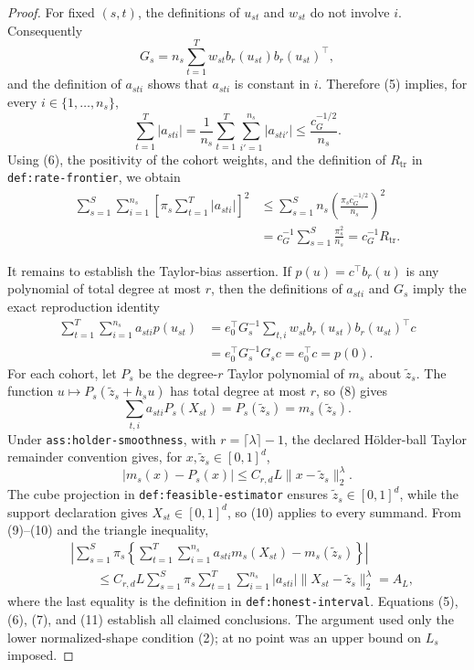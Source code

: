 \documentclass{article}
\begin{document}
\begin{proof}
For fixed \((s,t)\), the definitions of \(u_{st}\) and \(w_{st}\) do not involve \(i\).  Consequently
\[
G_s=n_s\sum_{t=1}^{T}w_{st}b_r(u_{st})b_r(u_{st})^{\top},
\]
and the definition of \(a_{sti}\) shows that \(a_{sti}\) is constant in \(i\).  Therefore (5) implies, for every \(i\in\{1,\ldots,n_s\}\),
\[
\sum_{t=1}^{T}|a_{sti}|
=\frac1{n_s}\sum_{t=1}^{T}\sum_{i'=1}^{n_s}|a_{sti'}|
\le \frac{c_G^{-1/2}}{n_s}.
\tag{6}
\]
Using (6), the positivity of the cohort weights, and the definition of \(R_{\mathrm{tr}}\) in \texttt{def:rate-frontier}, we obtain
\[
\begin{aligned}
\sum_{s=1}^{S}\sum_{i=1}^{n_s}
\left[\pi_s\sum_{t=1}^{T}|a_{sti}|\right]^2
&\le \sum_{s=1}^{S}n_s
\left(\frac{\pi_s c_G^{-1/2}}{n_s}\right)^2\\
&=c_G^{-1}\sum_{s=1}^{S}\frac{\pi_s^2}{n_s}
=c_G^{-1}R_{\mathrm{tr}}.
\end{aligned}
\tag{7}
\]

It remains to establish the Taylor-bias assertion.  If \(p(u)=c^{\top}b_r(u)\) is any polynomial of total degree at most \(r\), then the definitions of \(a_{sti}\) and \(G_s\) imply the exact reproduction identity
\[
\begin{aligned}
\sum_{t=1}^{T}\sum_{i=1}^{n_s}a_{sti}p(u_{st})
&=e_0^{\top}G_s^{-1}
  \sum_{t,i}w_{st}b_r(u_{st})b_r(u_{st})^{\top}c\\
&=e_0^{\top}G_s^{-1}G_sc
=e_0^{\top}c
=p(0).
\end{aligned}
\tag{8}
\]
For each cohort, let \(P_s\) be the degree-\(r\) Taylor polynomial of \(m_s\) about \(\widetilde z_s\).  The function \(u\mapsto P_s(\widetilde z_s+h_su)\) has total degree at most \(r\), so (8) gives
\[
\sum_{t,i}a_{sti}P_s(X_{st})=P_s(\widetilde z_s)=m_s(\widetilde z_s).
\tag{9}
\]
Under \texttt{ass:holder-smoothness}, with \(r=\lceil\lambda\rceil-1\), the declared H\"older-ball Taylor remainder convention gives, for \(x,\widetilde z_s\in[0,1]^d\),
\[
|m_s(x)-P_s(x)|
\le C_{r,d}L\|x-\widetilde z_s\|_2^{\lambda}.
\tag{10}
\]
The cube projection in \texttt{def:feasible-estimator} ensures \(\widetilde z_s\in[0,1]^d\), while the support declaration gives \(X_{st}\in[0,1]^d\), so (10) applies to every summand.  From (9)--(10) and the triangle inequality,
\[
\begin{aligned}
&\left|
\sum_{s=1}^{S}\pi_s
\left\{\sum_{t=1}^{T}\sum_{i=1}^{n_s}
a_{sti}m_s(X_{st})-m_s(\widetilde z_s)\right\}
\right|\\
&\qquad\le
C_{r,d}L\sum_{s=1}^{S}\pi_s
\sum_{t=1}^{T}\sum_{i=1}^{n_s}|a_{sti}|
\|X_{st}-\widetilde z_s\|_2^{\lambda}
=A_L,
\end{aligned}
\tag{11}
\]
where the last equality is the definition in \texttt{def:honest-interval}.  Equations (5), (6), (7), and (11) establish all claimed conclusions.  The argument used only the lower normalized-shape condition (2); at no point was an upper bound on \(L_s\) imposed.
\end{proof}
\end{document}
